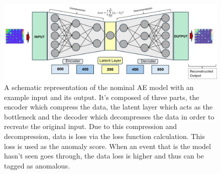 \begin{figure}[H]
    \centering
    \includegraphics[scale=0.48]{figs/ch6/AE-arch.png}
    \caption{A schematic representation of the nominal AE model with an example input and its output. It's composed of three parts, the encoder which compress the data, the latent layer which acts as the bottleneck
    and the decoder which decompresses the data in order to recreate the original input. Due to this compression and decompression, data is loss via the loss function calculation. This loss is used as the anomaly score.
    When an event that is the model hasn't seen goes through, the data loss is higher and thus can be tagged as anomalous.}
\label{fig:AE-arch}
\end{figure}

